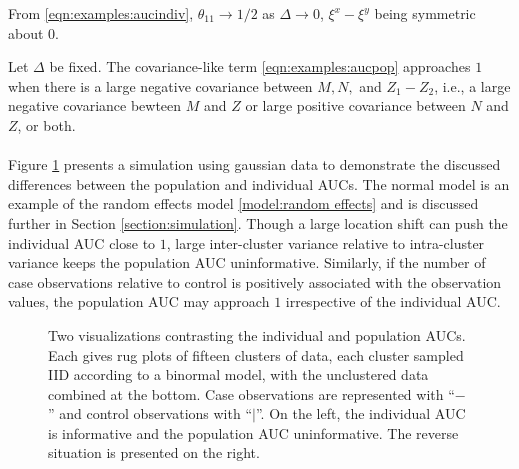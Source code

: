 \documentclass[12pt]{article}
\DeclareMathOperator{\AUC}{AUC}
\newcommand{\aucindiv}{\theta_{11}}%
\begin{document}
From \eqref{eqn:examples:aucindiv},  $\aucindiv\to 1/2$ as $\Delta\to 0$,
$\xi^x-\xi^y$ being symmetric about $0$.

Let $\Delta$ be fixed. The covariance-like term
\eqref{eqn:examples:aucpop} approaches $1$ when there is a large
negative covariance between $M,N,$ and $Z_1-Z_2$, i.e., a large
negative covariance bewteen $M$ and $Z$ or large positive covariance
between $N$ and $Z$, or both.
\\\\
Figure \ref{fig:comparison} presents a simulation using gaussian data
to demonstrate the discussed differences between the population and
individual AUCs. The normal model is an example of the random effects
model \eqref{model:random effects} and is discussed further in Section
\ref{section:simulation}. Though a large location shift can push the
individual AUC close to $1$, large inter-cluster variance relative to
intra-cluster variance keeps the population AUC
uninformative. Similarly, if the number of case observations relative
to control is positively associated with the observation values, the
population AUC may approach $1$ irrespective of the individual AUC.



\begin{figure}[!tbp]
  \centering
  \hfill
  \caption{Two visualizations contrasting the individual and
    population AUCs. Each gives rug plots of fifteen clusters of data, each cluster sampled IID
    according to a binormal model, with the unclustered
    data combined at the bottom. Case observations are represented with ``$-$'' and
    control observations with ``$|$''. On the left, the individual AUC is
    informative and the population AUC uninformative. The reverse situation is
    presented on the right.}  \label{fig:comparison}
\end{figure}
\end{document}
